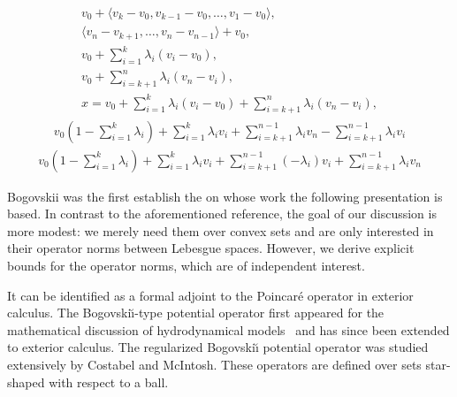 \documentclass[10pt,a4paper]{article}
\begin{document}
\begin{align}
        v_0 + \langle v_k - v_0, v_{k-1} - v_0, \dots, v_1 - v_0 \rangle,
        \\
        \langle v_n - v_{k+1}, \dots, v_n - v_{n-1} \rangle + v_{0},
        \\
        v_0 + \sum_{i=1}^{k} \lambda_{i} ( v_i - v_0 ),
        \\
        v_0 + \sum_{i=k+1}^{n} \lambda_{i} ( v_n - v_i ),
        \\
        x = v_0 + \sum_{i=1}^{k} \lambda_{i} ( v_i - v_0 ) + \sum_{i=k+1}^{n} \lambda_{i} ( v_n - v_i ),
    \end{align}
    \begin{align}
        v_0 \left( 1 - \sum_{i=1}^{k} \lambda_{i} \right)
        +
        \sum_{i=1}^{k} \lambda_{i} v_i 
        +
        \sum_{i=k+1}^{n-1} \lambda_{i} v_n
        -
        \sum_{i=k+1}^{n-1} \lambda_{i} v_i
    \end{align}
    \begin{align}
        v_0 \left( 1 - \sum_{i=1}^{k} \lambda_{i} \right)
        +
        \sum_{i=1}^{k} \lambda_{i} v_i 
        +
        \sum_{i=k+1}^{n-1} (-\lambda_{i}) v_i
        +
        \sum_{i=k+1}^{n-1} \lambda_{i} v_n
    \end{align}


    
    
    
    
    
    
    
    
    
    
    
    
    
    
    
    
    
    
    
    
    
    
    
    
    Bogovskii was the first establish the 
    on whose work the following presentation is based. 
    In contrast to the aforementioned reference, the goal of our discussion is more modest:
    we merely need them over convex sets and are only interested in their operator norms between Lebesgue spaces.
    However, we derive explicit bounds for the operator norms, which are of independent interest. 
    
    It can be identified as a formal adjoint to the Poincar\'e operator in exterior calculus. 
    The Bogovski\u{\i}-type potential operator first appeared for the mathematical discussion of hydrodynamical models~\cite{bogovskii1979solution} and has since been extended to exterior calculus. 
    The regularized Bogovski\u{\i} potential operator was studied extensively by Costabel and McIntosh.
    These operators are defined over sets star-shaped with respect to a ball. 
    
\end{document}
